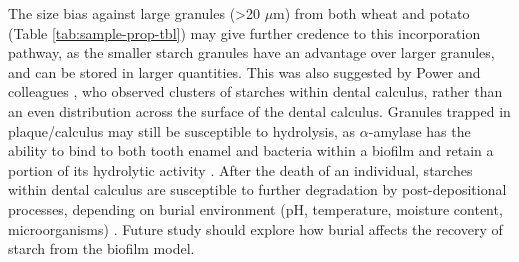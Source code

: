 \documentclass[utf8]{../templates/frontiersSCNS}
\begin{document}
The size bias against large granules (\textgreater20 \(\mu\)m) from both wheat and potato
(Table \ref{tab:sample-prop-tbl}) may give further credence to
this incorporation pathway, as the smaller starch granules have an advantage over
larger granules, and can be stored in larger quantities.
This was also suggested by Power and colleagues \citeyearpar{powerSEMCalculus2014}, who
observed clusters of starches within dental calculus, rather than an even
distribution across the surface of the dental calculus.
Granules trapped
in plaque/calculus may still be susceptible to hydrolysis, as \(\alpha\)-amylase has
the ability to bind to both tooth enamel and bacteria within a biofilm and retain
a portion of its hydrolytic activity
\citep{scannapiecoSalivaryAmylase1993, nikitkovaStarchBiofilms2013, tanBacterialViability2004, tanCalculusUltrastructure2004}.
After the death of an individual, starches within dental calculus are susceptible
to further degradation by post-depositional processes, depending on burial environment
(pH, temperature, moisture content, microorganisms)
\citep{henryCookingStarch2009, graneroStarchTaphonomy2020, haslamDecompositionStarch2004, francoStarchDegradation1992}.
Future study should explore how burial affects the recovery of starch from the
biofilm model.
\end{document}

